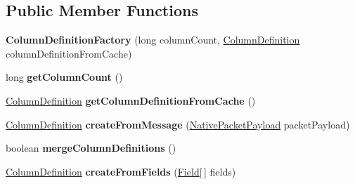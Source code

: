 \subsection*{Public Member Functions}
\begin{DoxyCompactItemize}
\item 
\mbox{\label{classcom_1_1mysql_1_1cj_1_1protocol_1_1a_1_1_column_definition_factory_ae00a6dce16530cd438008b0f38850337}} 
{\bfseries Column\+Definition\+Factory} (long column\+Count, \mbox{\hyperlink{interfacecom_1_1mysql_1_1cj_1_1protocol_1_1_column_definition}{Column\+Definition}} column\+Definition\+From\+Cache)
\item 
\mbox{\label{classcom_1_1mysql_1_1cj_1_1protocol_1_1a_1_1_column_definition_factory_adde861830933cd973f1bde7bfe1d4163}} 
long {\bfseries get\+Column\+Count} ()
\item 
\mbox{\label{classcom_1_1mysql_1_1cj_1_1protocol_1_1a_1_1_column_definition_factory_a6935c30af909c3267c63b0378de03a4a}} 
\mbox{\hyperlink{interfacecom_1_1mysql_1_1cj_1_1protocol_1_1_column_definition}{Column\+Definition}} {\bfseries get\+Column\+Definition\+From\+Cache} ()
\item 
\mbox{\label{classcom_1_1mysql_1_1cj_1_1protocol_1_1a_1_1_column_definition_factory_a47bfe4acb103a43984c8f86966e9a011}} 
\mbox{\hyperlink{interfacecom_1_1mysql_1_1cj_1_1protocol_1_1_column_definition}{Column\+Definition}} {\bfseries create\+From\+Message} (\mbox{\hyperlink{classcom_1_1mysql_1_1cj_1_1protocol_1_1a_1_1_native_packet_payload}{Native\+Packet\+Payload}} packet\+Payload)
\item 
\mbox{\label{classcom_1_1mysql_1_1cj_1_1protocol_1_1a_1_1_column_definition_factory_a463f6be609c68f3bdf101111712eeca7}} 
boolean {\bfseries merge\+Column\+Definitions} ()
\item 
\mbox{\label{classcom_1_1mysql_1_1cj_1_1protocol_1_1a_1_1_column_definition_factory_ae8bd15c8a4739d2c98e613dc24aa2eea}} 
\mbox{\hyperlink{interfacecom_1_1mysql_1_1cj_1_1protocol_1_1_column_definition}{Column\+Definition}} {\bfseries create\+From\+Fields} (\mbox{\hyperlink{classcom_1_1mysql_1_1cj_1_1result_1_1_field}{Field}}\mbox{[}$\,$\mbox{]} fields)
\end{DoxyCompactItemize}
